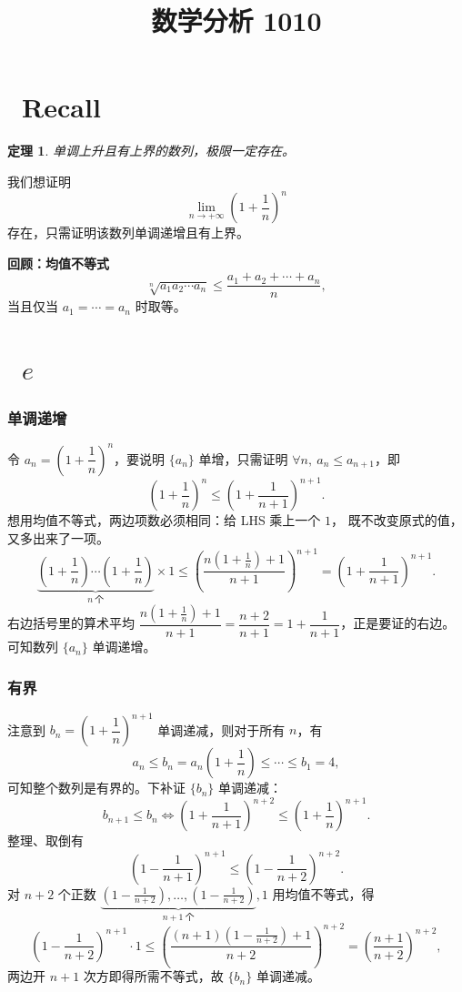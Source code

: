 \documentclass[UTF8,11pt]{ctexart}
\title{数学分析 1010}
\date{}
\theoremstyle{cnthm}
\newtheorem{thm}{定理}[section]
\begin{document}
\maketitle

\section{\ Recall}

\begin{thm}
单调上升且有上界的数列，极限一定存在。
\end{thm}

我们想证明
\[
\lim_{n\to+\infty}\left(1+\frac1n\right)^n
\]
存在，只需证明该数列单调递增且有上界。

\textbf{回顾：均值不等式}
\[
\sqrt[n]{a_1a_2\cdots a_n}\leq\frac{a_1+a_2+\cdots+a_n}{n},
\]
当且仅当 $a_1=\cdots=a_n$ 时取等。

\section{\ $e$}

\subsubsection*{单调递增}

令 $a_n=\left(1+\dfrac1n\right)^n$，要说明 $\{a_n\}$ 单增，只需证明
$\forall n,\ a_n\leq a_{n+1}$，即
\[
\left(1+\frac1n\right)^n\leq\left(1+\frac{1}{n+1}\right)^{n+1}.
\]
想用均值不等式，两边项数必须相同：给 LHS 乘上一个 $1$，
既不改变原式的值，又多出来了一项。
\[
\underbrace{\left(1+\frac1n\right)\cdots\left(1+\frac1n\right)}_{n\ \text{个}}\times1
\leq\left(\frac{n\left(1+\frac1n\right)+1}{n+1}\right)^{n+1}
=\left(1+\frac{1}{n+1}\right)^{n+1}.
\]
右边括号里的算术平均 $\dfrac{n\left(1+\frac1n\right)+1}{n+1}
=\dfrac{n+2}{n+1}=1+\dfrac{1}{n+1}$，正是要证的右边。
可知数列 $\{a_n\}$ 单调递增。

\subsubsection*{有界}

注意到 $b_n=\left(1+\dfrac1n\right)^{n+1}$ 单调递减，则对于所有 $n$，有
\[
a_n\leq b_n=a_n\left(1+\frac1n\right)\leq\cdots\leq b_1=4,
\]
可知整个数列是有界的。下补证 $\{b_n\}$ 单调递减：
\[
b_{n+1}\leq b_n
\iff\left(1+\frac{1}{n+1}\right)^{n+2}
\leq\left(1+\frac1n\right)^{n+1}.
\]
整理、取倒有
\[
\left(1-\frac{1}{n+1}\right)^{n+1}
\leq\left(1-\frac{1}{n+2}\right)^{n+2}.
\]
对 $n+2$ 个正数 $\underbrace{\left(1-\frac{1}{n+2}\right),\ldots,
\left(1-\frac{1}{n+2}\right)}_{n+1\ \text{个}},1$ 用均值不等式，得
\[
\left(1-\frac{1}{n+2}\right)^{n+1}\cdot1
\leq\left(\frac{(n+1)\left(1-\frac{1}{n+2}\right)+1}{n+2}\right)^{n+2}
=\left(\frac{n+1}{n+2}\right)^{n+2},
\]
两边开 $n+1$ 次方即得所需不等式，故 $\{b_n\}$ 单调递减。
\end{document}
